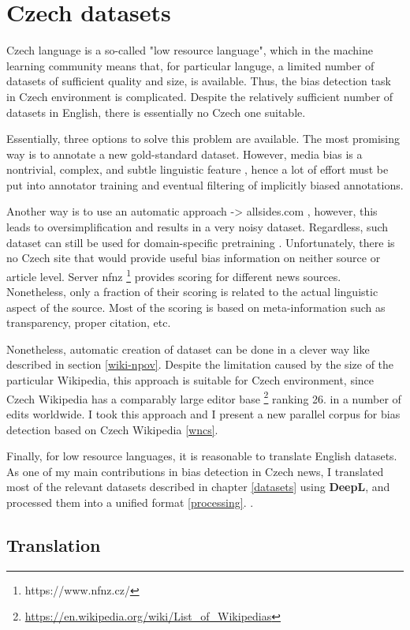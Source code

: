 \chapter{Czech datasets}
Czech language is a so-called "low resource language", which in the machine learning community means that, for particular languge, a limited number of datasets of sufficient quality  and size, is available. Thus, the bias detection task in Czech environment is complicated. Despite the relatively sufficient number of datasets in English, there is essentially no Czech one suitable.

 Essentially, three options to solve this problem are available. The most promising way is to annotate a new gold-standard dataset. However, media bias is a nontrivial, complex, and subtle linguistic feature , hence a lot of effort must be put into annotator training and eventual filtering of implicitly biased annotations.
 
 Another way is to use an automatic approach -> allsides.com , however, this leads to oversimplification and results in a very noisy dataset. Regardless, such dataset can still be used for domain-specific pretraining \cite{Spinde2021f}. Unfortunately, there is no Czech site that would provide useful bias information on neither source or article level. Server \Gls{nfnz} \footnote{https://www.nfnz.cz/} provides scoring for different news sources. Nonetheless, only a fraction of their scoring is related to the actual linguistic aspect of the source. Most of the scoring is based on meta-information such as transparency, proper citation, etc.
 
 Nonetheless, automatic creation of dataset can be done in a clever way like described in section \ref{wiki-npov}. Despite the limitation caused by the size of the particular Wikipedia, this approach is suitable for Czech environment, since Czech Wikipedia has a comparably large editor base \footnote{ \url{https://en.wikipedia.org/wiki/List_of_Wikipedias}} ranking 26. in a number of edits worldwide. I took this approach and I present a new parallel corpus for bias detection based on Czech Wikipedia \ref{wncs}.
 
 Finally, for low resource languages, it is reasonable to translate English datasets. As one of my main contributions in bias detection in Czech news, I translated most of the relevant datasets described in chapter \ref{datasets} using \textbf{DeepL}, and processed them into a unified format \ref{processing}. .
 
\section{Translation}

